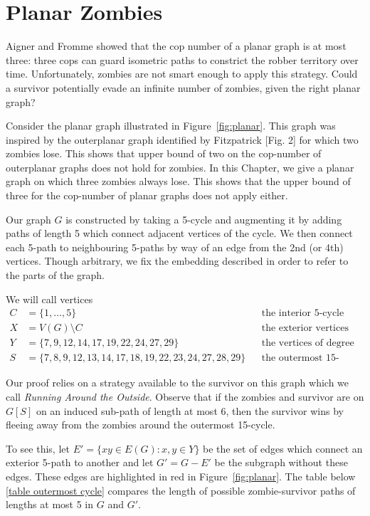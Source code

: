 \chapter{Planar Zombies}\label{chapter planar zombies}

Aigner and Fromme \cite{aigner1984game} showed that the cop number of a planar graph is at most three:
three cops can guard isometric paths to constrict the robber territory over time.
Unfortunately, zombies are not smart enough to apply this strategy. Could a survivor
potentially evade an infinite number of zombies, given the right planar graph?

Consider the planar graph illustrated in Figure~\ref{fig:planar}. This graph was inspired by the outerplanar graph identified by Fitzpatrick \cite{fitzpatrick2016deterministic}[Fig. 2] for which two zombies lose. This shows that upper bound of two on the cop-number of outerplanar graphs does not hold for zombies. In this Chapter, we give a planar graph on which three zombies always lose. This shows that the upper bound of three for the cop-number of planar graphs does not apply either.

Our graph $G$ is constructed by taking a 5-cycle and augmenting it by adding paths of length 5 which
connect adjacent vertices of the cycle. We then connect each 5-path to neighbouring 5-paths by way of an edge from the 2nd (or 4th) vertices. Though arbitrary, we fix the embedding described in order to refer to the parts of the graph.

We will call vertices
\begin{align*}
C &= \{ 1, \dots, 5 \} && \text{the interior 5-cycle} \\
X &= V(G) \setminus C && \text{the exterior vertices} \\
Y &= \{7, 9, 12, 14, 17, 19, 22, 24, 27, 29\} && \text{the vertices of degree 3.} \\
S &= \{ 7,8,9,12,13,14,17,18,19, 22,23,24,27,28,29 \} && \text{the outermost 15-cycle}
\end{align*}

Our proof relies on a strategy available to the survivor on this graph which we call \textit{Running Around the Outside}. Observe that if the zombies and survivor are on $G[S]$ on an induced sub-path of length at most 6, then the survivor wins by fleeing away from the zombies around the outermost 15-cycle.

To see this, let $E' = \{xy \in E(G) : x, y \in Y\}$ be the set of edges which connect an exterior 5-path to another and let $G' = G - E'$ be the subgraph without these edges. These edges are highlighted in red in Figure~\ref{fig:planar}.
The table below \ref{table outermost cycle} compares the length of possible zombie-survivor paths of
lengths at most 5 in $G$ and $G'$.

